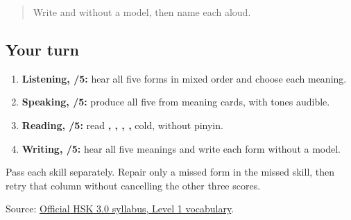 \begin{quote}
Write  and  without a model, then name each aloud.
\end{quote}

\subsection*{Your turn}
\begin{enumerate}
\raggedright
  \item \textbf{Listening, /5:} hear all five forms in mixed order and choose each meaning.
  \item \textbf{Speaking, /5:} produce all five from meaning cards, with tones audible.
  \item \textbf{Reading, /5:} read \textbf{, , , , } cold, without pinyin.
  \item \textbf{Writing, /5:} hear all five meanings and write each form without a model.
\end{enumerate}

Pass each skill separately. Repair only a missed form in the missed skill, then retry that column without cancelling the other three scores.

\begin{tcolorbox}[breakable,colback=teal!4,colframe=teal!35!black,title={Before you move on}]
Source: \href{https://hsk.cn-bj.ufileos.com/3.0/\%E6\%96\%B0\%E7\%89\%88HSK\%E8\%80\%83\%E8\%AF\%95\%E5\%A4\%A7\%E7\%BA\%B21219.pdf}{Official HSK 3.0 syllabus, Level 1 vocabulary}.
\end{tcolorbox}
